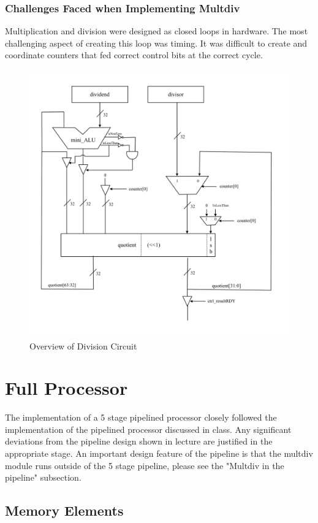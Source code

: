 \documentclass[letterpaper]{article}
\begin{document}
\subsubsection{Challenges Faced when Implementing Multdiv}
Multiplication and division were designed as closed loops in hardware. The most challenging aspect of creating this loop was timing. It was difficult to create and coordinate counters that fed correct control bits at the correct cycle.
\begin{figure}[h]
    \centering
    \includegraphics[width=\textwidth]{Divide.png}
    \caption{Overview of Division Circuit}
    \label{fig:my_label}
\end{figure}
\clearpage
\section{Full Processor}
The implementation of a 5 stage pipelined processor closely followed the implementation of the pipelined processor discussed in class. Any significant deviations from the pipeline design shown in lecture are justified in the appropriate stage. An important design feature of the pipeline is that the multdiv module runs outside of the 5 stage pipeline, please see the "Multdiv in the pipeline" subsection. 

\subsection{Memory Elements}
\end{document}
